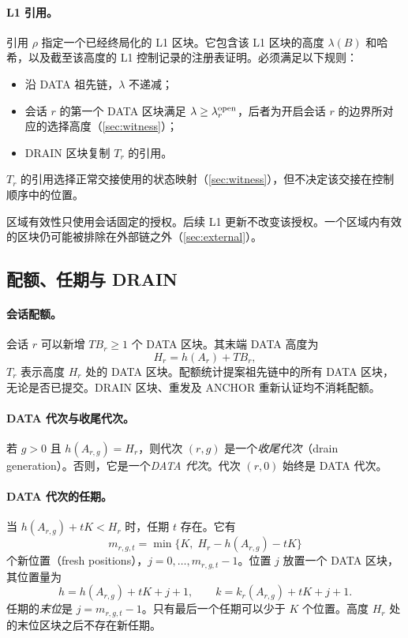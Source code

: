 \documentclass[11pt,a4paper]{article}
\newcommand{\TB}{\mathit{TB}}
\begin{document}
\paragraph{L1 引用。}
引用 $\rho$ 指定一个已经终局化的 L1 区块。它包含该 L1 区块的高度 $\lambda(B)$ 和哈希，以及截至该高度的 L1 控制记录的注册表证明。必须满足以下规则：
\begin{itemize}
\item 沿 DATA 祖先链，$\lambda$ 不递减；
\item 会话 $r$ 的第一个 DATA 区块满足 $\lambda\ge\lambda^{\rm open}_r$，后者为开启会话 $r$ 的边界所对应的选择高度（\cref{sec:witness}）；
\item DRAIN 区块复制 $T_r$ 的引用。
\end{itemize}
$T_r$ 的引用选择正常交接使用的状态映射（\cref{sec:witness}），但不决定该交接在控制顺序中的位置。

区域有效性只使用会话固定的授权。后续 L1 更新不改变该授权。一个区域内有效的区块仍可能被排除在外部链之外（\cref{sec:external}）。

\subsection{配额、任期与 DRAIN}\label{sec:quota}
\paragraph{会话配额。}
会话 $r$ 可以新增 $\TB_r\ge1$ 个 DATA 区块。其末端 DATA 高度为
\[
 H_r=h(A_r)+\TB_r,
\]
$T_r$ 表示高度 $H_r$ 处的 DATA 区块。配额统计提案祖先链中的所有 DATA 区块，无论是否已提交。DRAIN 区块、重发及 ANCHOR 重新认证均不消耗配额。

\paragraph{DATA 代次与收尾代次。}
若 $g>0$ 且 $h(A_{r,g})=H_r$，则代次 $(r,g)$ 是一个\emph{收尾代次}（drain generation）。否则，它是一个\emph{DATA 代次}。代次 $(r,0)$ 始终是 DATA 代次。

\paragraph{DATA 代次的任期。}
当 $h(A_{r,g})+tK<H_r$ 时，任期 $t$ 存在。它有
\[
 m_{r,g,t}=\min\{K,\;H_r-h(A_{r,g})-tK\}
\]
个新位置（fresh positions），$j=0,\ldots,m_{r,g,t}-1$。位置 $j$ 放置一个 DATA 区块，其位置量为
\[
 h=h(A_{r,g})+tK+j+1,\qquad k=k_r(A_{r,g})+tK+j+1.
\]
任期的\emph{末位}是 $j=m_{r,g,t}-1$。只有最后一个任期可以少于 $K$ 个位置。高度 $H_r$ 处的末位区块之后不存在新任期。
\end{document}
